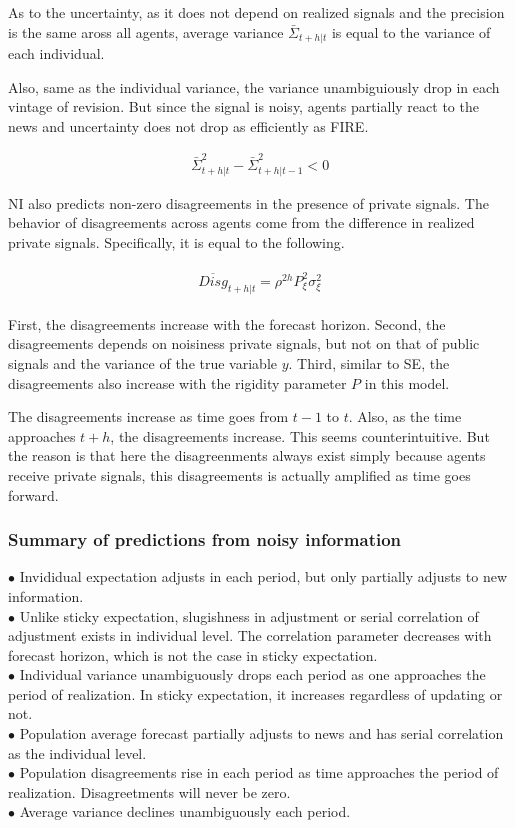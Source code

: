 \documentclass[]{article}
\begin{document}
As to the uncertainty, as it does not depend on realized signals and the precision is the same aross all agents, average variance $\bar \Sigma_{t+h|t}$ is equal to the variance of each individual. 

Also, same as the individual variance, the variance unambiguiously drop in each vintage of revision. But since the signal is noisy, agents partially react to the news and uncertainty does not drop as efficiently as FIRE. 

\begin{eqnarray}
\bar \Sigma^2_{t+h|t} -  \bar \Sigma^2_{t+h|t-1}< 0 
\end{eqnarray}

NI also predicts non-zero disagreements in the presence of private signals. The behavior of disagreements across agents come from the difference in realized private signals. Specifically, it is equal to the following. 

\begin{eqnarray}
\begin{aligned}
\overline {Disg}_{t+h|t} = \rho^{2h} P^2_\xi \sigma^2_\xi  
\end{aligned}
\end{eqnarray}

First, the disagreements increase with the forecast horizon.  Second, the disagreements depends on noisiness private signals, but not on that of public signals and the variance of the true variable $y$. Third, similar to SE, the disagreements also increase with the rigidity parameter $P$ in this model.

The disagreements increase as time goes from $t-1$ to $t$. Also, as the time approaches $t+h$, the disagreements increase. This seems counterintuitive. But the reason is that here the disagreenments always exist simply because agents receive private signals, this disagreements is actually amplified as time goes forward. 


\subsubsection{Summary of predictions from noisy information}

$\bullet$  Invididual expectation adjusts in each period, but only partially adjusts to new information. \\
$\bullet$ Unlike sticky expectation, slugishness in adjustment or serial correlation of adjustment exists in individual level. The correlation parameter decreases with forecast horizon, which is not the case in sticky expectation.\\
$\bullet$  Individual variance unambiguously drops each period as one approaches the period of realization. In sticky expectation, it increases regardless of updating or not. \\ 
$\bullet$  Population average forecast partially adjusts to news and has serial correlation as the individual level. \\
$\bullet$  Population disagreements rise in each period as time approaches the period of realization. Disagreetments will never be zero. \\
$\bullet$  Average variance declines unambiguously each period. 
\end{document}
